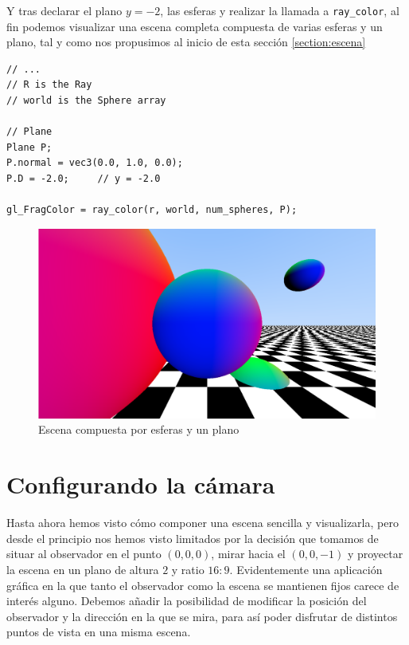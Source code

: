 Y tras declarar el plano $y=-2$, las esferas y realizar la llamada a \verb|ray_color|, al fin podemos visualizar una escena completa compuesta de varias esferas y un plano, tal y como nos propusimos al inicio de esta sección \ref{section:escena}

\begin{lstlisting}
// ... 
// R is the Ray
// world is the Sphere array

// Plane
Plane P;
P.normal = vec3(0.0, 1.0, 0.0);
P.D = -2.0;     // y = -2.0

gl_FragColor = ray_color(r, world, num_spheres, P);
\end{lstlisting}

\begin{figure} [ht]
    \centering
    \includegraphics[scale = 0.25]{img/C7/escena-completa.png}
    \caption{Escena compuesta por esferas y un plano}
    \label{fig:escena-completa}
\end{figure}

\section{Configurando la cámara}
\label{section:camara}

Hasta ahora hemos visto cómo componer una escena sencilla y visualizarla, pero desde el principio nos hemos visto limitados por la decisión que tomamos de situar al observador en el punto $(0,0,0)$, mirar hacia el $(0,0,-1)$ y proyectar la escena en un plano de altura $2$ y ratio $16:9$. Evidentemente una aplicación gráfica en la que tanto el observador como la escena se mantienen fijos carece de interés alguno. Debemos añadir la posibilidad de modificar la posición del observador y la dirección en la que se mira, para así poder disfrutar de distintos puntos de vista en una misma escena.

